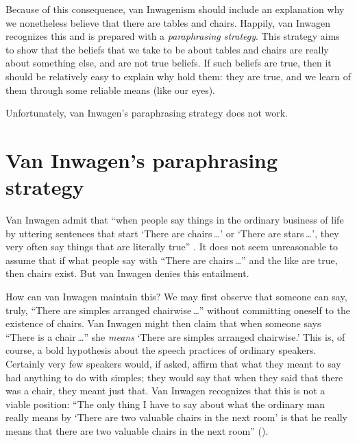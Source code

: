 \documentclass[11pt]{article}
\begin{document}
\begin{spacing}{1.5}
Because of this consequence, van Inwagenism should include an
explanation why we nonetheless believe that there are tables and
chairs.  Happily, van Inwagen recognizes this and is prepared with a
{\em paraphrasing strategy}.  This strategy aims to show that the
beliefs that we take to be about tables and chairs are really about
something else, and are not true beliefs.  If such beliefs are true,
then it should be relatively easy to explain why hold them: they are
true, and we learn of them through some reliable means (like our
eyes).

Unfortunately, van Inwagen's paraphrasing strategy does not work.

\section{Van Inwagen's paraphrasing strategy}
\label{i-para}
Van Inwagen admit that ``when people say things in the ordinary
business of life by uttering sentences that start `There are
chairs\,\ldots ' or `There are stars\,\ldots ', they very often say
things that are literally true'' \cite[102]{inwagen1995}.  It does not
seem unreasonable to assume that if what people say with ``There are
chairs\,\ldots '' and the like are true, then chairs exist.  But van
Inwagen denies this entailment.

How can van Inwagen maintain this?  We may first observe that someone
can say, truly, ``There are simples arranged chairwise\,\ldots ''
without committing oneself to the existence of chairs.  Van Inwagen
might then claim that when someone says ``There is a chair\,\ldots ''
she {\em means} `There are simples arranged chairwise.'  This is, of
course, a bold hypothesis about the speech practices of ordinary
speakers.  Certainly very few speakers would, if asked, affirm that
what they meant to say had anything to do with simples; they would say
that when they said that there was a chair, they meant just that.  Van
Inwagen recognizes that this is not a viable position: ``The only
thing I have to say about what the ordinary man really means by `There
are two valuable chairs in the next room' is that he really means that
there are two valuable chairs in the next room''
(\citeyear[106]{inwagen1995}).


\end{spacing}
\end{document}
